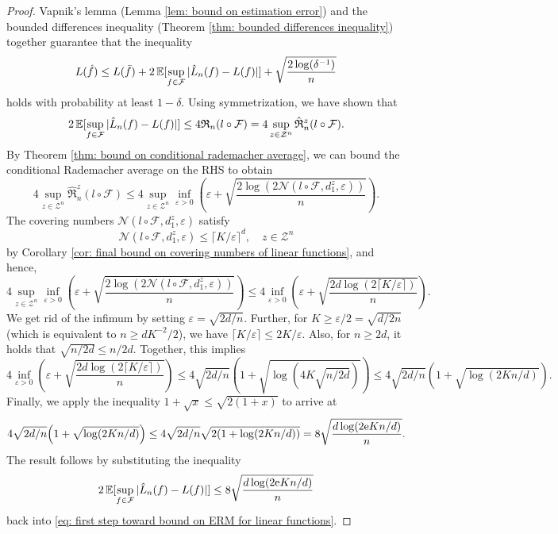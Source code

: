 \begin{proof}
Vapnik's lemma (Lemma \ref{lem: bound on estimation error}) and the bounded differences inequality (Theorem \ref{thm: bounded differences inequality}) together guarantee that the inequality
\begin{equation}
\label{eq: first step toward bound on ERM for linear functions}
    L(\hat{f}) \leq L(\bar{f}) + 2 \Exp[\sup_{f \in \mathcal{F}} \abs*{\hat L_n(f) - L(f)}] + \sqrt{\frac{2 \log(\delta^{-1})}{n}}
\end{equation}
holds with probability at least $1 - \delta$. Using symmetrization, we have shown that
\[
    2 \Exp[\sup_{f \in \mathcal{F}} \abs*{\hat L_n(f) - L(f)}] \leq 4 \mathfrak{R}_n(l \circ \mathcal{F}) = 4 \sup_{z \in \mathcal{Z}^n} \hat{\mathfrak{R}}_n^z(l \circ \mathcal{F}).
\]
By Theorem \ref{thm: bound on conditional rademacher average}, we can bound the conditional Rademacher average on the RHS to obtain
\[
    4 \sup_{z \in \mathcal{Z}^n} \hat{\mathfrak{R}}_n^z(l \circ \mathcal{F}) \leq 4 \sup_{z \in \mathcal{Z}^n} \inf_{\varepsilon > 0} \left( \varepsilon + \sqrt{\frac{2 \log(2 \mathcal{N}(l \circ \mathcal{F}, d_1^z, \varepsilon))}{n}} \right).
\]
The covering numbers $\mathcal{N}(l \circ \mathcal{F}, d_1^z, \varepsilon)$ satisfy
\[
    \mathcal{N}(l \circ \mathcal{F}, d_1^z, \varepsilon) \leq {\lceil K / \varepsilon \rceil}^d, \quad z \in \mathcal{Z}^n
\]
by Corollary \ref{cor: final bound on covering numbers of linear functions}, and hence,
\[
    4 \sup_{z \in \mathcal{Z}^n} \inf_{\varepsilon > 0} \left( \varepsilon + \sqrt{\frac{2 \log(2 \mathcal{N}(l \circ \mathcal{F}, d_1^z, \varepsilon))}{n}} \right) \leq 4 \inf_{\varepsilon > 0} \left( \varepsilon + \sqrt{\frac{2d \log(2 {\lceil K / \varepsilon \rceil})}{n}} \right).
\]
We get rid of the infimum by setting $\varepsilon = \sqrt{2d / n}$. Further, for $K \geq \varepsilon / 2 = \sqrt{d / 2n}$ (which is equivalent to $n \geq d K^{-2} / 2$), we have $\lceil K / \varepsilon \rceil \leq 2K / \varepsilon$. Also, for $n \geq 2d$, it holds that $\sqrt{n / 2d} \leq n / 2d$. Together, this implies
\[
    4 \inf_{\varepsilon > 0} \left( \varepsilon + \sqrt{\frac{2d \log(2 {\lceil K / \varepsilon \rceil})}{n}} \right) \leq 4 \sqrt{2d / n} \left( 1 + \sqrt{\log(4K \sqrt{n / 2d})} \right) \leq 4 \sqrt{2d / n} \left( 1 + \sqrt{\log(2Kn / d)} \right).
\]
Finally, we apply the inequality $1 + \sqrt{x} \leq \sqrt{2 (1 + x)}$ to arrive at
\[
    4 \sqrt{2d / n} \left( 1 + \sqrt{\log(2Kn / d)} \right) \leq 4 \sqrt{2d / n} \sqrt{2 (1 + \log(2Kn / d))} = 8 \sqrt{\frac{d \log(2 \e Kn / d)}{n}}.
\]
The result follows by substituting the inequality
\[
    2 \Exp[\sup_{f \in \mathcal{F}} \abs*{\hat L_n(f) - L(f)}] \leq 8 \sqrt{\frac{d \log(2 \e Kn / d)}{n}}
\]
back into \eqref{eq: first step toward bound on ERM for linear functions}.
\end{proof}


